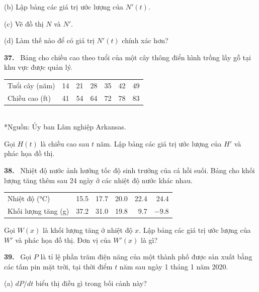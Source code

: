 \documentclass[12pt,a4paper]{article}
\newcommand{\bt}[1]{\par\smallskip\noindent\textbf{#1.}\ }
\begin{document}
(b) Lập bảng các giá trị ước lượng của $N'(t)$.

(c) Vẽ đồ thị $N$ và $N'$.

(d) Làm thế nào để có giá trị $N'(t)$ chính xác hơn?
\bt{37} Bảng cho chiều cao theo tuổi của một cây thông điển hình trồng lấy gỗ tại khu vực được quản lý.
\begin{center}\begin{tabular}{lrrrrrr}\toprule
Tuổi cây (năm)&14&21&28&35&42&49\\
Chiều cao (ft)&41&54&64&72&78&83\\\bottomrule
\end{tabular}\\*{\small Nguồn: Ủy ban Lâm nghiệp Arkansas.}\end{center}
Gọi $H(t)$ là chiều cao sau $t$ năm. Lập bảng các giá trị ước lượng của $H'$ và phác họa đồ thị.
\bt{38} Nhiệt độ nước ảnh hưởng tốc độ sinh trưởng của cá hồi suối. Bảng cho khối lượng tăng thêm sau 24 ngày ở các nhiệt độ nước khác nhau.
\begin{center}\begin{tabular}{lrrrrr}\toprule
Nhiệt độ (°C)&15.5&17.7&20.0&22.4&24.4\\
Khối lượng tăng (g)&37.2&31.0&19.8&9.7&$-9.8$\\\bottomrule
\end{tabular}\end{center}
Gọi $W(x)$ là khối lượng tăng ở nhiệt độ $x$. Lập bảng các giá trị ước lượng của $W'$ và phác họa đồ thị. Đơn vị của $W'(x)$ là gì?

\bt{39} Gọi $P$ là tỉ lệ phần trăm điện năng của một thành phố được sản xuất bằng các tấm pin mặt trời, tại thời điểm $t$ năm sau ngày 1 tháng 1 năm 2020.

(a) $dP/dt$ biểu thị điều gì trong bối cảnh này?
\end{document}
